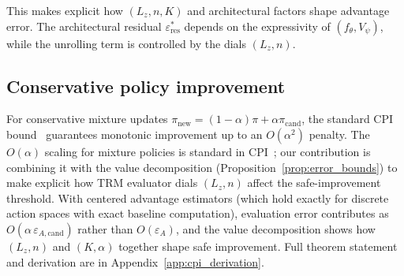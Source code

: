 \documentclass{article}
\theoremstyle{plain}
\theoremstyle{definition}
\theoremstyle{remark}
\newtheorem{remark}[theorem]{Remark}
\newcommand{\shortonly}[1]{#1}
\newcommand{\longonly}[1]{}
\newcommand{\shortonly}[1]{}
\newcommand{\longonly}[1]{#1}
\newcommand{\E}{\mathbb{E}}
\begin{document}
\longonly{
\begin{remark}[Concentrability-adjusted bound]
\label{rem:concentrability}
To make the distribution-shift cost explicit, suppose the replay distribution $\mu$ satisfies:
\begin{equation}
C_\mu^{\{\pi,\pi_{\mathrm{cand}}\}} := \!\sup_{s \in \mathcal{R}_{\{\pi, \pi_{\mathrm{cand}}\}}}\! \frac{\max(d_\pi(s), d_{\pi_{\mathrm{cand}}}(s))}{\mu(s)} < \infty.
\label{eq:concentrability}
\end{equation}
If the value function achieves $L^2(\mu)$ error $\delta_\mu^2 := \E_{s \sim \mu}[(U_n(s) - V^\pi(s))^2]$, then standard uniform convergence arguments~\citep{Chen2019Concentrability} yield, with high probability over training data:
\[
\varepsilon_A \lesssim \sqrt{C_\mu^{\{\pi,\pi_{\mathrm{cand}}\}}} \cdot \delta_\mu + \text{(covering-number terms)}.
\]
The concentrability coefficient $C_\mu$ quantifies coverage: if $\mu$ has poor support on states reachable under $\pi_{\mathrm{cand}}$, the bound degrades.
This is why off-policy replay with diverse exploration is essential.
We do not formalize the covering-number dependence, as it requires specifying the function class; the bound above provides structural intuition.
\end{remark}}

This makes explicit how $(L_z, n, K)$ and architectural factors shape advantage error.
The architectural residual $\varepsilon_{\mathrm{res}}^*$ depends on the expressivity of $(f_\theta, V_\psi)$, while the unrolling term is controlled by the dials $(L_z, n)$.

\shortonly{
\subsection{Conservative policy improvement}
\label{sec:cpi}

For conservative mixture updates $\pi_{\mathrm{new}}=(1-\alpha)\pi+\alpha\pi_{\mathrm{cand}}$, the standard CPI bound~\citep{KakadeLangford2002} guarantees monotonic improvement up to an $O(\alpha^2)$ penalty.
The $O(\alpha)$ scaling for mixture policies is standard in CPI~\citep{KakadeLangford2002}; our contribution is combining it with the value decomposition (Proposition~\ref{prop:error_bounds}) to make explicit how TRM evaluator dials $(L_z, n)$ affect the safe-improvement threshold.
With centered advantage estimators (which hold exactly for discrete action spaces with exact baseline computation), evaluation error contributes as $O(\alpha\,\varepsilon_{A,\mathrm{cand}})$ rather than $O(\varepsilon_A)$, and the value decomposition shows how $(L_z,n)$ and $(K,\alpha)$ together shape safe improvement.
Full theorem statement and derivation are in Appendix~\ref{app:cpi_derivation}.}
\end{document}
